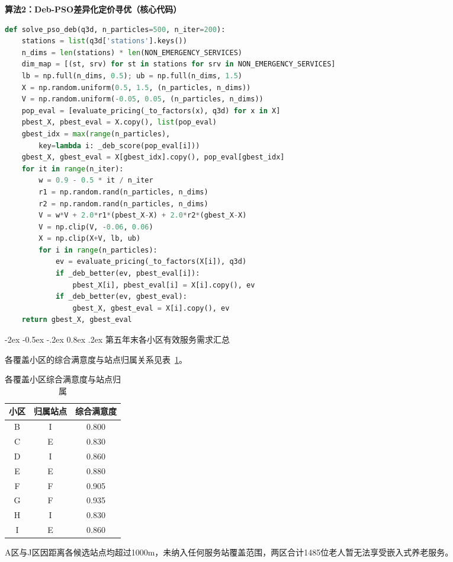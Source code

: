 \documentclass[zihao=-4]{cumcmthesis}
\makeatletter
\renewcommand\subsection{\@startsection{subsection}{2}{\z@}%
    {-2ex \@plus -0.5ex \@minus -.2ex}%
    {0.8ex \@plus .2ex}%
    {\normalfont\normalsize\bfseries}}
\makeatother
\begin{document}
\textbf{算法2：Deb-PSO差异化定价寻优（核心代码）}

\begin{lstlisting}[language=Python, caption={Deb-PSO差异化定价寻优}, label={code:pso}]
def solve_pso_deb(q3d, n_particles=500, n_iter=200):
    stations = list(q3d['stations'].keys())
    n_dims = len(stations) * len(NON_EMERGENCY_SERVICES)
    dim_map = [(st, srv) for st in stations for srv in NON_EMERGENCY_SERVICES]
    lb = np.full(n_dims, 0.5); ub = np.full(n_dims, 1.5)
    X = np.random.uniform(0.5, 1.5, (n_particles, n_dims))
    V = np.random.uniform(-0.05, 0.05, (n_particles, n_dims))
    pop_eval = [evaluate_pricing(_to_factors(x), q3d) for x in X]
    pbest_X, pbest_eval = X.copy(), list(pop_eval)
    gbest_idx = max(range(n_particles),
        key=lambda i: _deb_score(pop_eval[i]))
    gbest_X, gbest_eval = X[gbest_idx].copy(), pop_eval[gbest_idx]
    for it in range(n_iter):
        w = 0.9 - 0.5 * it / n_iter
        r1 = np.random.rand(n_particles, n_dims)
        r2 = np.random.rand(n_particles, n_dims)
        V = w*V + 2.0*r1*(pbest_X-X) + 2.0*r2*(gbest_X-X)
        V = np.clip(V, -0.06, 0.06)
        X = np.clip(X+V, lb, ub)
        for i in range(n_particles):
            ev = evaluate_pricing(_to_factors(X[i]), q3d)
            if _deb_better(ev, pbest_eval[i]):
                pbest_X[i], pbest_eval[i] = X[i].copy(), ev
            if _deb_better(ev, gbest_eval):
                gbest_X, gbest_eval = X[i].copy(), ev
    return gbest_X, gbest_eval
\end{lstlisting}

\subsection{第五年末各小区有效服务需求汇总}

各覆盖小区的综合满意度与站点归属关系见表~\ref{tab:appendixsat}。

\begin{table}[H]
\centering
\caption{各覆盖小区综合满意度与站点归属}
\label{tab:appendixsat}
\begin{tabular}{ccc}
\toprule
小区 & 归属站点 & 综合满意度 \\
\midrule
B & I & 0.800 \\
C & E & 0.830 \\
D & I & 0.860 \\
E & E & 0.880 \\
F & F & 0.905 \\
G & F & 0.935 \\
H & I & 0.830 \\
I & E & 0.860 \\
\bottomrule
\end{tabular}
\end{table}

A区与J区因距离各候选站点均超过1000m，未纳入任何服务站覆盖范围，两区合计1485位老人暂无法享受嵌入式养老服务。
\end{document}
